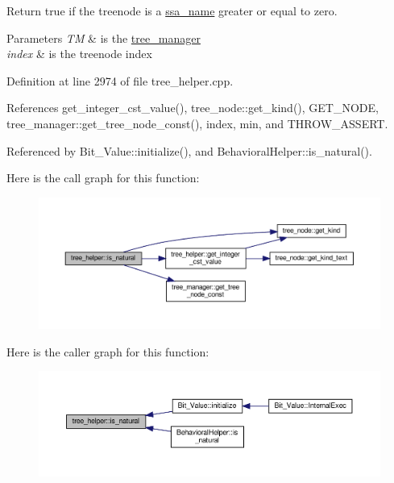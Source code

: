 Return true if the treenode is a \hyperlink{structssa__name}{ssa\+\_\+name} greater or equal to zero. 


\begin{DoxyParams}{Parameters}
{\em TM} & is the \hyperlink{classtree__manager}{tree\+\_\+manager} \\
\hline
{\em index} & is the treenode index \\
\hline
\end{DoxyParams}


Definition at line 2974 of file tree\+\_\+helper.\+cpp.



References get\+\_\+integer\+\_\+cst\+\_\+value(), tree\+\_\+node\+::get\+\_\+kind(), G\+E\+T\+\_\+\+N\+O\+DE, tree\+\_\+manager\+::get\+\_\+tree\+\_\+node\+\_\+const(), index, min, and T\+H\+R\+O\+W\+\_\+\+A\+S\+S\+E\+RT.



Referenced by Bit\+\_\+\+Value\+::initialize(), and Behavioral\+Helper\+::is\+\_\+natural().

Here is the call graph for this function\+:
\nopagebreak
\begin{figure}[H]
\begin{center}
\leavevmode
\includegraphics[width=350pt]{d7/d99/classtree__helper_a7d79cc8b2338c134901fb22916b8a57e_cgraph}
\end{center}
\end{figure}
Here is the caller graph for this function\+:
\nopagebreak
\begin{figure}[H]
\begin{center}
\leavevmode
\includegraphics[width=350pt]{d7/d99/classtree__helper_a7d79cc8b2338c134901fb22916b8a57e_icgraph}
\end{center}
\end{figure}
\mbox{\label{classtree__helper_a28c813825d5b4e548775c72d511af4eb}} 
